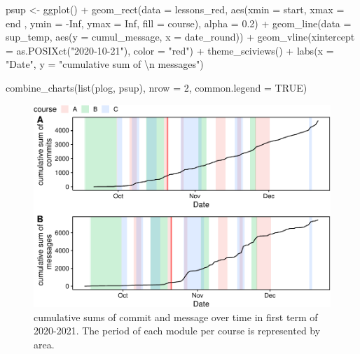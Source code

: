 \documentclass[
]{article}
\newenvironment{Shaded}{\begin{snugshade}}{\end{snugshade}}
\newcommand{\AttributeTok}[1]{\textcolor[rgb]{0.77,0.63,0.00}{#1}}
\newcommand{\ConstantTok}[1]{\textcolor[rgb]{0.00,0.00,0.00}{#1}}
\newcommand{\DecValTok}[1]{\textcolor[rgb]{0.00,0.00,0.81}{#1}}
\newcommand{\FloatTok}[1]{\textcolor[rgb]{0.00,0.00,0.81}{#1}}
\newcommand{\FunctionTok}[1]{\textcolor[rgb]{0.00,0.00,0.00}{#1}}
\newcommand{\NormalTok}[1]{#1}
\newcommand{\OtherTok}[1]{\textcolor[rgb]{0.56,0.35,0.01}{#1}}
\newcommand{\SpecialCharTok}[1]{\textcolor[rgb]{0.00,0.00,0.00}{#1}}
\newcommand{\StringTok}[1]{\textcolor[rgb]{0.31,0.60,0.02}{#1}}
\begin{document}
\begin{Shaded}
\begin{Highlighting}[]
\NormalTok{psup }\OtherTok{\textless{}{-}} \FunctionTok{ggplot}\NormalTok{() }\SpecialCharTok{+}
  \FunctionTok{geom\_rect}\NormalTok{(}\AttributeTok{data =}\NormalTok{ lessons\_red, }\FunctionTok{aes}\NormalTok{(}\AttributeTok{xmin =}\NormalTok{ start, }\AttributeTok{xmax =}\NormalTok{ end , }\AttributeTok{ymin =} \SpecialCharTok{{-}}\ConstantTok{Inf}\NormalTok{,  }\AttributeTok{ymax =} \ConstantTok{Inf}\NormalTok{, }\AttributeTok{fill =}\NormalTok{ course), }\AttributeTok{alpha =} \FloatTok{0.2}\NormalTok{) }\SpecialCharTok{+}
  \FunctionTok{geom\_line}\NormalTok{(}\AttributeTok{data =}\NormalTok{ sup\_temp, }\FunctionTok{aes}\NormalTok{(}\AttributeTok{y =}\NormalTok{ cumul\_message, }\AttributeTok{x =}\NormalTok{ date\_round)) }\SpecialCharTok{+}
  \FunctionTok{geom\_vline}\NormalTok{(}\AttributeTok{xintercept =} \FunctionTok{as.POSIXct}\NormalTok{(}\StringTok{"2020{-}10{-}21"}\NormalTok{), }\AttributeTok{color =} \StringTok{"red"}\NormalTok{) }\SpecialCharTok{+}
  \FunctionTok{theme\_sciviews}\NormalTok{() }\SpecialCharTok{+}
  \FunctionTok{labs}\NormalTok{(}\AttributeTok{x =} \StringTok{"Date"}\NormalTok{, }\AttributeTok{y =} \StringTok{"cumulative sum of  }\SpecialCharTok{\textbackslash{}n}\StringTok{ messages"}\NormalTok{)}

\FunctionTok{combine\_charts}\NormalTok{(}\FunctionTok{list}\NormalTok{(plog, psup), }\AttributeTok{nrow =} \DecValTok{2}\NormalTok{, }\AttributeTok{common.legend =} \ConstantTok{TRUE}\NormalTok{)}
\end{Highlighting}
\end{Shaded}

\begin{figure}
\centering
\includegraphics{teaching_data_science_files/figure-latex/unnamed-chunk-5-1.pdf}
\caption{cumulative sums of commit and message over time in first term
of 2020-2021. The period of each module per course is represented by
area.}
\end{figure}
\end{document}
